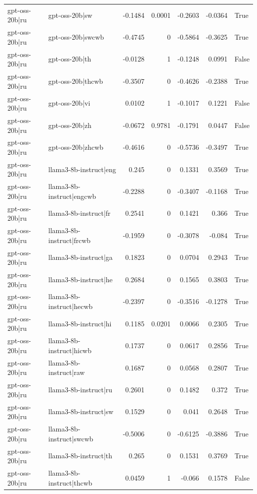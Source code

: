 \begin{table}
\begin{tabular}{l l r r r r l}
gpt-oss-20b|ru & gpt-oss-20b|sw & -0.1484 & 0.0001 & -0.2603 & -0.0364 & True \\
gpt-oss-20b|ru & gpt-oss-20b|swcwb & -0.4745 & 0 & -0.5864 & -0.3625 & True \\
gpt-oss-20b|ru & gpt-oss-20b|th & -0.0128 & 1 & -0.1248 & 0.0991 & False \\
gpt-oss-20b|ru & gpt-oss-20b|thcwb & -0.3507 & 0 & -0.4626 & -0.2388 & True \\
gpt-oss-20b|ru & gpt-oss-20b|vi & 0.0102 & 1 & -0.1017 & 0.1221 & False \\
gpt-oss-20b|ru & gpt-oss-20b|zh & -0.0672 & 0.9781 & -0.1791 & 0.0447 & False \\
gpt-oss-20b|ru & gpt-oss-20b|zhcwb & -0.4616 & 0 & -0.5736 & -0.3497 & True \\
gpt-oss-20b|ru & llama3-8b-instruct|eng & 0.245 & 0 & 0.1331 & 0.3569 & True \\
gpt-oss-20b|ru & llama3-8b-instruct|engcwb & -0.2288 & 0 & -0.3407 & -0.1168 & True \\
gpt-oss-20b|ru & llama3-8b-instruct|fr & 0.2541 & 0 & 0.1421 & 0.366 & True \\
gpt-oss-20b|ru & llama3-8b-instruct|frcwb & -0.1959 & 0 & -0.3078 & -0.084 & True \\
gpt-oss-20b|ru & llama3-8b-instruct|ga & 0.1823 & 0 & 0.0704 & 0.2943 & True \\
gpt-oss-20b|ru & llama3-8b-instruct|he & 0.2684 & 0 & 0.1565 & 0.3803 & True \\
gpt-oss-20b|ru & llama3-8b-instruct|hecwb & -0.2397 & 0 & -0.3516 & -0.1278 & True \\
gpt-oss-20b|ru & llama3-8b-instruct|hi & 0.1185 & 0.0201 & 0.0066 & 0.2305 & True \\
gpt-oss-20b|ru & llama3-8b-instruct|hicwb & 0.1737 & 0 & 0.0617 & 0.2856 & True \\
gpt-oss-20b|ru & llama3-8b-instruct|raw & 0.1687 & 0 & 0.0568 & 0.2807 & True \\
gpt-oss-20b|ru & llama3-8b-instruct|ru & 0.2601 & 0 & 0.1482 & 0.372 & True \\
gpt-oss-20b|ru & llama3-8b-instruct|sw & 0.1529 & 0 & 0.041 & 0.2648 & True \\
gpt-oss-20b|ru & llama3-8b-instruct|swcwb & -0.5006 & 0 & -0.6125 & -0.3886 & True \\
gpt-oss-20b|ru & llama3-8b-instruct|th & 0.265 & 0 & 0.1531 & 0.3769 & True \\
gpt-oss-20b|ru & llama3-8b-instruct|thcwb & 0.0459 & 1 & -0.066 & 0.1578 & False \\

\end{tabular}
\end{table}
